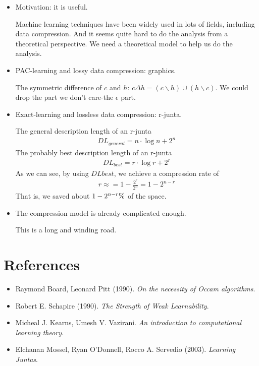 \documentclass[12pt]{article}
\begin{document}
\begin{itemize}
\item Motivation: it is useful.

  Machine learning techniques have been widely used in lots of fields,
  including data compression. And it seems quite hard to do the
  analysis from a theoretical perspective. We need a theoretical model
  to help us do the analysis.
\item PAC-learning and lossy data compression: graphics.

  The symmetric difference of $c$ and $h$: $c \Delta h = (c \backslash
  h) \cup (h \backslash c)$. We could drop the part we don't care-the
  $\epsilon$ part.
\item Exact-learning and lossless data compression: r-junta.

  The general description length of an r-junta
  \begin{eqnarray*}
    DL_{general} = n \cdot \log n + 2^n
  \end{eqnarray*}
  The probably best description length of an r-junta
  \begin{eqnarray*}
    DL_{best} = r \cdot \log r + 2^r
  \end{eqnarray*}
  As we can see, by using $DL{best}$, we achieve a compression rate of
  \begin{eqnarray*}
    r \approx = 1 - \frac {2^r}{2^n} = 1 - 2^{n-r}
  \end{eqnarray*}
  That is, we saved about $1 - 2^{n-r} \time 100\%$ of the space.
\item The compression model is already complicated enough.

  This is a long and winding road.
\end{itemize}

\section{References}

\begin{itemize}
\item Raymond Board, Leonard Pitt (1990). \emph {On the necessity of
    Occam algorithms}.
\item Robert E. Schapire (1990). \emph {The Strength of Weak
    Learnability}.
\item Micheal J. Kearns, Umesh V. Vazirani. \emph {An introduction to
    computational learning theory}.
\item Elchanan Mossel, Ryan O'Donnell, Rocco A. Servedio (2003). \emph
  {Learning Juntas}.
\end{itemize}
\end{document}

